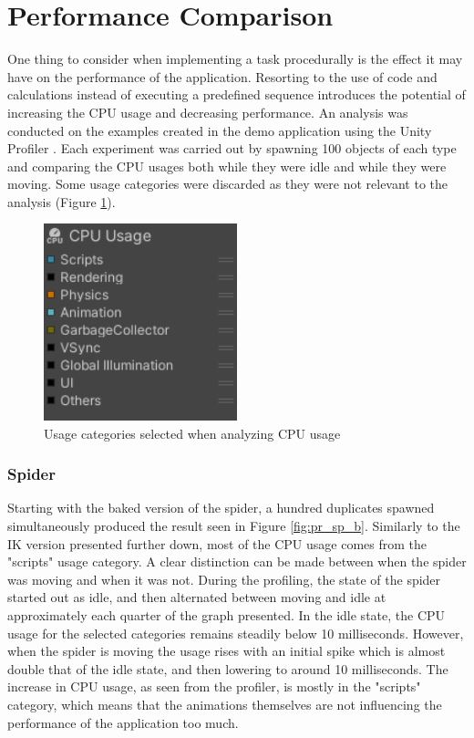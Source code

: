 \section{Performance Comparison}
One thing to consider when implementing a task procedurally is the
effect it may have on the performance of the application. Resorting to the use
of code and calculations instead of executing a predefined sequence introduces
the potential of increasing the CPU usage and decreasing performance. An
analysis was conducted on the examples created in the demo application using the
Unity Profiler \cite{unity_profiler}. Each experiment was carried out by
spawning 100 objects of each type and comparing the CPU usages both while they
were idle and while they were moving. Some usage categories were discarded as
they were not relevant to the analysis (Figure \ref{fig:profiler_settings}).

\begin{figure}[h!]
    \centering
    \captionsetup{justification=centering}
    \includegraphics[width=0.5\textwidth]{grafika/profiler_settings.png}
    \caption{Usage categories selected when analyzing CPU usage}
    \label{fig:profiler_settings}
\end{figure}

\subsubsection{Spider}
Starting with the baked version of the spider, a hundred duplicates spawned
simultaneously produced the result seen in Figure \ref{fig:pr_sp_b}. Similarly
to the IK version presented further down, most of the CPU usage comes from the
"scripts" usage category. A clear distinction can be made between when the
spider was moving and when it was not. During the profiling, the state of the
spider started out as idle, and then alternated between moving and idle at
approximately each quarter of the graph presented. In the idle state, the CPU
usage for the selected categories remains steadily below 10 milliseconds.
However, when the spider is moving the usage rises with an initial spike which
is almost double that of the idle state, and then lowering to around 10
milliseconds. The increase in CPU usage, as seen from the profiler, is mostly in
the "scripts" category, which means that the animations themselves are not
influencing the performance of the application too much.

